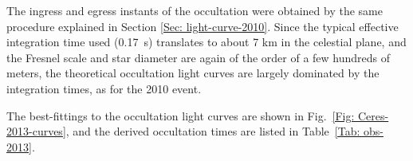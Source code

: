 \documentclass[useAMS,usenatbib]{mn2e}
\begin{document}
The ingress and egress instants of the occultation were obtained by the same procedure explained in Section \ref{Sec: light-curve-2010}. %
Since the typical effective integration time used (0.17~s) translates to about 7 km in the celestial plane, and the Fresnel scale and star diameter are again of the order of a few hundreds of meters, the theoretical occultation light curves are largely dominated by the integration times, as for the 2010 event.

The best-fittings to the occultation light curves are shown in Fig.~\ref{Fig: Ceres-2013-curves}, and the derived occultation times are listed in Table~\ref{Tab: obs-2013}.
\end{document}
